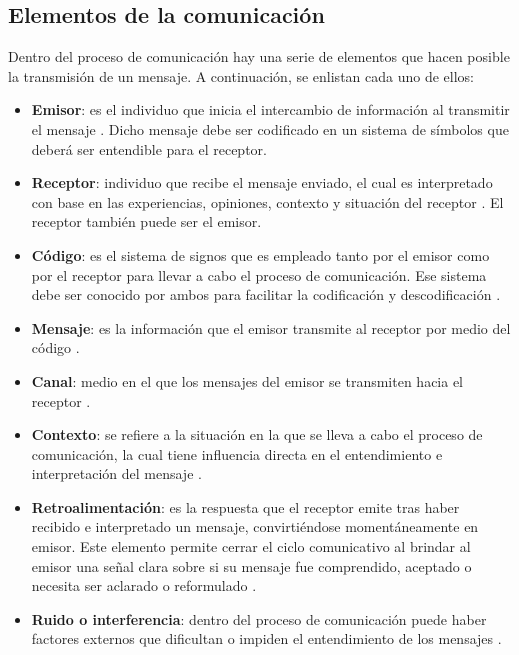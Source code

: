 \subsection{Elementos de la comunicación}
Dentro del proceso de comunicación hay una serie de elementos que hacen posible la transmisión de un mensaje. A continuación, se enlistan cada uno de ellos: 
\begin{itemize}
    
\item \textbf{Emisor}: es el individuo que inicia el intercambio de información al transmitir el mensaje \cite{ref22}. Dicho mensaje debe ser codificado en un sistema de símbolos que deberá ser entendible para el receptor. 

\item \textbf{Receptor}: individuo que recibe el mensaje enviado, el cual es interpretado con base en las experiencias, opiniones, contexto y situación del receptor \cite{ref20}. El receptor también puede ser el emisor.

\item \textbf{Código}: es el sistema de signos que es empleado tanto por el emisor como por el receptor para llevar a cabo el proceso de comunicación. Ese sistema debe ser conocido por ambos para facilitar la codificación y descodificación \cite{ref23}.

\item \textbf{Mensaje}: es la información que el emisor transmite al receptor por medio del código \cite{ref24}.

\item \textbf{Canal}: medio en el que los mensajes del emisor se transmiten hacia el receptor \cite{ref20}.

\item \textbf{Contexto}: se refiere a la situación en la que se lleva a cabo el proceso de comunicación, la cual tiene influencia directa en el entendimiento e interpretación del mensaje \cite{ref24}.

\item \textbf{Retroalimentación}: es la respuesta que el receptor emite tras haber recibido e interpretado un mensaje, convirtiéndose momentáneamente en emisor. Este elemento permite cerrar el ciclo comunicativo al brindar al emisor una señal clara sobre si su mensaje fue comprendido, aceptado o necesita ser aclarado o reformulado \cite{ref23}.

\item \textbf{Ruido o interferencia}: dentro del proceso de comunicación puede haber factores externos que dificultan o impiden el entendimiento de los mensajes \cite{ref23}.
\end{itemize}

